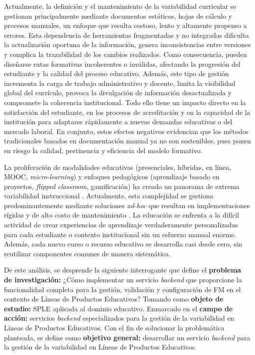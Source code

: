 {    Actualmente, la definición y el mantenimiento de la variabilidad curricular se gestionan 
    principalmente mediante documentos estáticos, hojas de cálculo y procesos manuales, un enfoque que resulta 
    costoso, lento y altamente propenso a errores. Esta dependencia de herramientas fragmentadas y no integradas 
    dificulta la actualización oportuna de la información, genera inconsistencias entre versiones y 
    complica la trazabilidad de los cambios realizados. Como consecuencia, pueden diseñarse rutas formativas 
    incoherentes o inválidas, afectando la progresión del estudiante y la calidad del proceso educativo. Además, 
    este tipo de gestión incrementa la carga de trabajo administrativo y docente, limita la visibilidad global 
    del currículo, provoca la divulgación de información desactualizada y compromete la coherencia institucional. 
    Todo ello tiene un impacto directo en la satisfacción del estudiante, en los procesos de acreditación y en la 
    capacidad de la institución para adaptarse rápidamente a nuevas demandas educativas o del mercado laboral. 
    En conjunto, estos efectos negativos evidencian que los métodos tradicionales basados en documentación 
    manual ya no son sostenibles, pues ponen en riesgo la calidad, pertinencia y eficiencia del modelo formativo.

    La proliferación de modalidades educativas (presenciales, híbridas, en línea,
    \ac{MOOC}, \textit{micro-learning}) y enfoques pedagógicos (aprendizaje basado en
    proyectos, \textit{flipped classroom}, gamificación) ha creado un panorama de extrema
    variabilidad instruccional \citep{bates2019teaching}. Actualmente, esta complejidad se
    gestiona predominantemente mediante soluciones \textit{ad-hoc} que resultan en
    implementaciones rígidas y de alto costo de mantenimiento \citep{sanchez2020metodologia}.
    La educación se enfrenta a la difícil actividad de crear experiencias de
    aprendizaje verdaderamente personalizadas para cada estudiante o contexto
    institucional sin un esfuerzo manual enorme. Además, cada nuevo curso o
    recurso educativo se desarrolla casi desde cero, sin reutilizar componentes
    comunes de manera sistemática.

    De este análisis, se desprende la siguiente interrogante que define el
    \textbf{problema de investigación:}
    ¿Cómo implementar un servicio \textit{backend} que proporcione la funcionalidad completa
    para la gestión, validación y configuración de \ac{FM} en el contexto de Líneas de Productos Educativos?
    Tomando como \textbf{objeto de estudio:} 
    \ac{SPLE} aplicada al dominio educativo.
    Enmarcado en el \textbf{campo de acción:}
    servicios \textit{backend} especializados para la gestión de la variabilidad en Líneas de Productos Educativos.
    Con el fin de solucionar la problemática planteada, se define como \textbf{objetivo general:}
    desarrollar un servicio \textit{backend} para la gestión de la variabilidad
    en Líneas de Productos Educativos.

}
